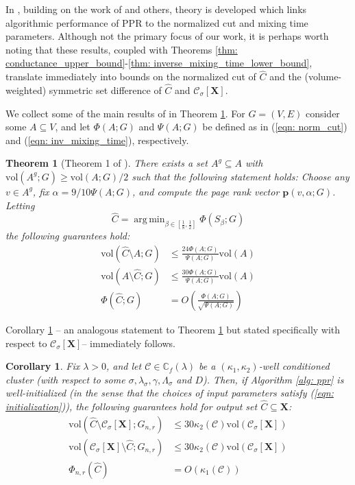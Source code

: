 \documentclass{article}
\newcommand{\vol}{\mathrm{vol}}
\newcommand{\1}{\mathbf{1}}
\newcommand{\pbf}{\mathbf{p}}
\newcommand{\Xbf}{\mathbf{X}}
\newcommand{\Cbb}{\mathbb{C}}
\newcommand{\Cset}{\mathcal{C}}
\newcommand{\Csig}{\Cset_{\sigma}}
\DeclareMathOperator*{\argmin}{arg\,min}
\theoremstyle{aldenthm}
\newtheorem{theorem}{Theorem}
\newtheorem{corollary}{Corollary}
\theoremstyle{aldenrmrk}
\begin{document}
In \cite{zhu2013}, building on the work of \cite{andersen2006} and others, theory is developed which links algorithmic performance of PPR to the normalized cut and mixing time parameters. Although not the primary focus of our work, it is perhaps worth noting that these results, coupled with Theorems \ref{thm: conductance_upper_bound}-\ref{thm: inverse_mixing_time_lower_bound}, translate immediately into bounds on the normalized cut of $\widehat{C}$ and the (volume-weighted) symmetric set difference of $\widehat{C}$ and $\Csig[\Xbf]$.  

We collect some of the main results of \cite{zhu2013} in Theorem \ref{thm: ppr_cluster}. For $G = (V,E)$ consider some $A \subseteq V$, and let $\Phi(A; G)$ and $\Psi(A; G)$ be defined as in (\ref{eqn: norm_cut}) and (\ref{eqn: inv_mixing_time}), respectively.
\begin{theorem}[Theorem 1 of \cite{zhu2013}]
	\label{thm: ppr_cluster}
	There exists a set $A^g \subseteq A$ with $\vol(A^g;G) \geq \vol(A;G)/2$ such that the following statement holds: Choose any $v \in A^g$, fix $\alpha = 9 / 10 \Psi(A; G)$, and compute the page rank vector $\pbf(v,\alpha; G)$. Letting 
	\begin{equation*}
	\widehat{C} = \argmin_{\beta \in [\frac{1}{8}, \frac{1}{2}]} \Phi(S_{\beta}; G)
	\end{equation*}
	the following guarantees hold:
	\begin{align*}
	\vol(\widehat{C} \setminus A; G) & \leq \frac{24 \Phi(A; G)}{\Psi(A; G)} \vol(A) \\
	\vol(A \setminus \widehat{C}; G)  & \leq \frac{30 \Phi(A; G)}{\Psi(A; G)} \vol(A) \\
	\Phi(\widehat{C}; G) & = O\left(\frac{\Phi(A; G)}{\sqrt{\Psi(A; G)}}\right)
	\end{align*}
\end{theorem}

Corollary \ref{cor: ppr_cluster} -- an analogous statement to Theorem \ref{thm: ppr_cluster} but stated specifically with respect to $\Csig[\Xbf]$-- immediately follows.
\begin{corollary}
	\label{cor: ppr_cluster}
	Fix $\lambda > 0$, and let $\Cset \in \Cbb_f(\lambda)$ be a $(\kappa_1,\kappa_2)$-well conditioned cluster (with respect to some $\sigma, \lambda_{\sigma}, \gamma, \Lambda_{\sigma}$ and $D$). Then, if Algorithm \ref{alg: ppr} is well-initialized (in the sense that the choices of input parameters satisfy (\ref{eqn: initialization})), the following guarantees hold for output set $\widehat{C} \subseteq \Xbf$:
	\begin{align*}
	\vol(\widehat{C} \setminus \Csig[\Xbf]; G_{n,r})  & \leq 30 \kappa_2(\Cset) \vol(\Csig[\Xbf]) \\
	\vol(\Csig[\Xbf] \setminus \widehat{C}; G_{n,r}) & \leq 30 \kappa_2(\Cset) \vol(\Csig[\Xbf]) \\
	\Phi_{n,r}(\widehat{C}) & = O\left(\kappa_1(\Cset)\right)
	\end{align*}
\end{corollary} 
\end{document}
